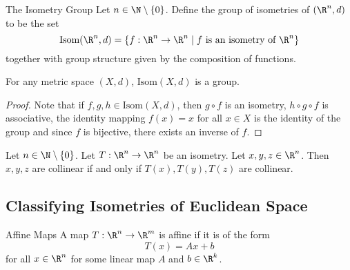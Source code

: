 \documentclass[a4paper]{article}
\begin{document}
\begin{defn}{The Isometry Group}{} Let $n\in\N\setminus\{0\}$. Define the group of isometries of $(\R^n,d)$ to be the set $$\text{Isom}(\R^n,d)=\{f:\R^n\to\R^n\;|\;f\text{ is an isometry of }\R^n\}$$ together with group structure given by the composition of functions. 
\end{defn}

\begin{lmm}{}{} For any metric space $(X,d)$, $\text{Isom}(X,d)$ is a group. \tcbline
\begin{proof} Note that if $f,g,h\in\text{Isom}(X,d)$, then $g\circ f$ is an isometry, $h\circ g\circ f$ is associative, the identity mapping $f(x)=x$ for all $x\in X$ is the identity of the group and since $f$ is bijective, there exists an inverse of $f$. 
\end{proof}
\end{lmm}

\begin{prp}{}{} Let $n\in\N\setminus\{0\}$. Let $T:\R^n\to\R^n$ be an isometry. Let $x,y,z\in\R^n$. Then $x,y,z$ are collinear if and only if $T(x),T(y),T(z)$ are collinear. 
\end{prp}

\subsection{Classifying Isometries of Euclidean Space}
\begin{defn}{Affine Maps}{} A map $T:\R^n\to\R^m$ is affine if it is of the form $$T(x)=Ax+b$$ for all $x\in\R^n$ for some linear map $A$ and $b\in\R^k$. 
\end{defn}
\end{document}
